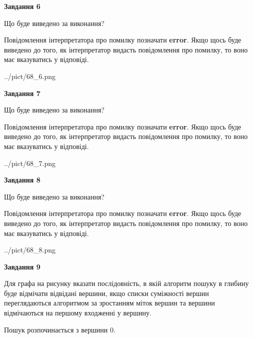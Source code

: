 \documentclass[12pt, ukrainian]{article}
\begin{document}
{\begin {large}
{\begin {center}\textbf{Завдання 6}\end {center}}\par
Що буде виведено за виконання?

Повідомлення інтерпретатора про помилку позначати \textbf{error}.
Якщо щось буде виведено до того, як інтерпретатор видасть повідомлення про помилку, 
то воно має вказуватись у відповіді. \par


\begin{center}
	{../pict/68_6.png}
\end{center}
\newpage

{\begin {center}\textbf{Завдання 7}\end {center}}\par
Що буде виведено за виконання?

Повідомлення інтерпретатора про помилку позначати \textbf{error}.
Якщо щось буде виведено до того, як інтерпретатор видасть повідомлення про помилку, 
то воно має вказуватись у відповіді. \par


\begin{center}
	{../pict/68_7.png}
\end{center}
\newpage

{\begin {center}\textbf{Завдання 8}\end {center}}\par
Що буде виведено за виконання?

Повідомлення інтерпретатора про помилку позначати \textbf{error}.
Якщо щось буде виведено до того, як інтерпретатор видасть повідомлення про помилку, 
то воно має вказуватись у відповіді. \par


\begin{center}
	{../pict/68_8.png}
\end{center}
\newpage

{\begin {center}\textbf{Завдання 9}\end {center}}\par
Для графа на рисунку вказати послідовність, в якій алгоритм пошуку в глибину буде відмічати відвідані вершини, якщо списки суміжності вершин переглядаються алгоритмом за зростанням міток вершин та вершини відмічаються на першому вход\-женні у вершину.\par
Пошук розпочинається з вершини 0.\par


\end{large}}
\end{document}
